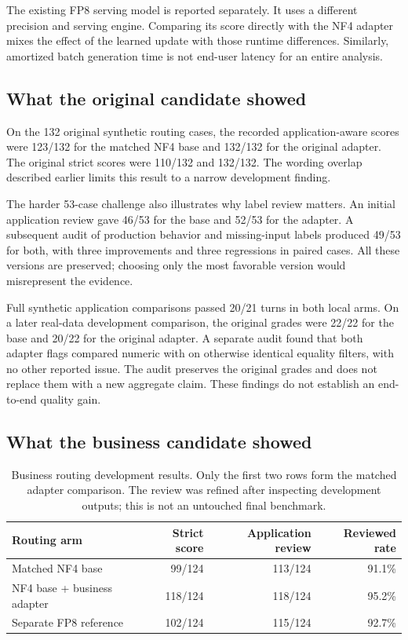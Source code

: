 \documentclass[11pt,a4paper]{article}
\newcommand{\code}[1]{\texttt{\detokenize{#1}}}
\begin{document}
The existing FP8 serving model is reported separately. It uses a different
precision and serving engine. Comparing its score directly with the NF4 adapter
mixes the effect of the learned update with those runtime differences. Similarly,
amortized batch generation time is not end-user latency for an entire analysis.

\subsection{What the original candidate showed}

On the 132 original synthetic routing cases, the recorded application-aware
scores were 123/132 for the matched NF4 base and 132/132 for the original adapter.
The original strict scores were 110/132 and 132/132. The wording overlap described
earlier limits this result to a narrow development finding.~\cite{originaleval}

The harder 53-case challenge also illustrates why label review matters.
An initial application review gave 46/53 for the base and 52/53 for the adapter.
A subsequent audit of production behavior and missing-input labels produced
49/53 for both, with three improvements and three regressions in paired cases.
All these versions are preserved; choosing only the most favorable version
would misrepresent the evidence.~\cite{challenge}

Full synthetic application comparisons passed 20/21 turns in both local arms.
On a later real-data development comparison, the original grades were 22/22 for
the base and 20/22 for the original adapter. A separate audit found that both
adapter flags compared numeric \code{0.0} with \code{0} on otherwise identical
equality filters, with no other reported issue. The audit preserves the original
grades and does not replace them with a new aggregate claim. These findings do
not establish an end-to-end quality gain.~\cite{workflow,numericaudit}

\subsection{What the business candidate showed}

\begin{table}[htbp]
\centering
\begin{tabular}{@{}lrrr@{}}
\toprule
Routing arm & Strict score & Application review & Reviewed rate \\
\midrule
Matched NF4 base & 99/124 & 113/124 & 91.1\% \\
NF4 base + business adapter & 118/124 & 118/124 & 95.2\% \\
Separate FP8 reference & 102/124 & 115/124 & 92.7\% \\
\bottomrule
\end{tabular}
\caption{Business routing development results. Only the first two rows form the
matched adapter comparison. The review was refined after inspecting development
outputs; this is not an untouched final benchmark.}
\label{tab:business}
\end{table}
\end{document}
